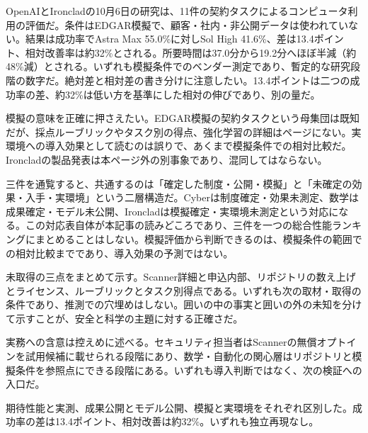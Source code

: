 OpenAIとIroncladの10月6日の研究は、11件の契約タスクによるコンピュータ利用の評価だ。条件はEDGAR模擬で、顧客・社内・非公開データは使われていない。結果は成功率でAstra Max 55.0\%に対しSol High 41.6\%、差は13.4ポイント、相対改善率は約32\%とされる。所要時間は37.0分から19.2分へほぼ半減（約48\%減）とされる。いずれも模擬条件でのベンダー測定であり、暫定的な研究段階の数字だ。絶対差と相対差の書き分けに注意したい。13.4ポイントは二つの成功率の差、約32\%は低い方を基準にした相対の伸びであり、別の量だ。\cite{ironclad}

模擬の意味を正確に押さえたい。EDGAR模擬の契約タスクという母集団は既知だが、採点ルーブリックやタスク別の得点、強化学習の詳細はページにない。実環境への導入効果として読むのは誤りで、あくまで模擬条件での相対比較だ。Ironcladの製品発表は本ページ外の別事象であり、混同してはならない。\cite{ironclad}

三件を通覧すると、共通するのは「確定した制度・公開・模擬」と「未確定の効果・入手・実環境」という二層構造だ。Cyberは制度確定・効果未測定、数学は成果確定・モデル未公開、Ironcladは模擬確定・実環境未測定という対応になる。この対応表自体が本記事の読みどころであり、三件を一つの総合性能ランキングにまとめることはしない。模擬評価から判断できるのは、模擬条件の範囲での相対比較までであり、導入効果の予測ではない。\cite{cybermission}\cite{mathrelease}\cite{ironclad}

未取得の三点をまとめて示す。Scanner詳細と申込内部、リポジトリの数え上げとライセンス、ルーブリックとタスク別得点である。いずれも次の取材・取得の条件であり、推測での穴埋めはしない。囲いの中の事実と囲いの外の未知を分けて示すことが、安全と科学の主題に対する正確さだ。\cite{cybermission}\cite{mathrelease}\cite{ironclad}

実務への含意は控えめに述べる。セキュリティ担当者はScannerの無償オプトインを試用候補に載せられる段階にあり、数学・自動化の関心層はリポジトリと模擬条件を参照点にできる段階にある。いずれも導入判断ではなく、次の検証への入口だ。\cite{cybermission}\cite{mathrelease}\cite{ironclad}

\begin{technicalnote}[Note]
期待性能と実測、成果公開とモデル公開、模擬と実環境をそれぞれ区別した。成功率の差は13.4ポイント、相対改善は約32\%。いずれも独立再現なし。
\end{technicalnote}
